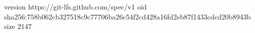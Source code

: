 version https://git-lfs.github.com/spec/v1
oid sha256:758b062cb327518c9c77706ba26c54f2cd428a16fd2eb87f1433cdcd20b8943b
size 2147

